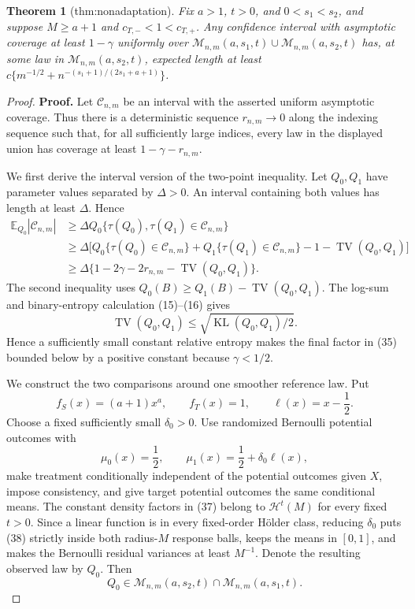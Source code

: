 \documentclass{article}
\newtheorem{theorem}{Theorem}
\begin{document}
\begin{theorem}[thm:nonadaptation]\label{thm:nonadaptation}
Fix \(a>1\), \(t>0\), and \(0<s_1<s_2\), and suppose \(M\ge a+1\) and \(c_{T,-}<1<c_{T,+}\). Any confidence interval with asymptotic coverage at least \(1-\gamma\) uniformly over \(\mathcal M_{n,m}(a,s_1,t)\cup\mathcal M_{n,m}(a,s_2,t)\) has, at some law in \(\mathcal M_{n,m}(a,s_2,t)\), expected length at least \(c\{m^{-1/2}+n^{-(s_1+1)/(2s_1+a+1)}\}\).
\end{theorem}
\begin{proof}
\textbf{Proof.}
Let \(\mathcal C_{n,m}\) be an interval with the asserted uniform asymptotic coverage. Thus there is a deterministic sequence \(r_{n,m}\to0\) along the indexing sequence such that, for all sufficiently large indices, every law in the displayed union has coverage at least \(1-\gamma-r_{n,m}\).

We first derive the interval version of the two-point inequality. Let \(Q_0,Q_1\) have parameter values separated by \(\Delta>0\). An interval containing both values has length at least \(\Delta\). Hence
\[
\begin{aligned}
\mathbb E_{Q_0}|\mathcal C_{n,m}|
&\ge\Delta Q_0\{\tau(Q_0),\tau(Q_1)\in\mathcal C_{n,m}\}\\
&\ge\Delta\bigl[Q_0\{\tau(Q_0)\in\mathcal C_{n,m}\}
+Q_1\{\tau(Q_1)\in\mathcal C_{n,m}\}
-1-\operatorname{TV}(Q_0,Q_1)\bigr]\\
&\ge\Delta\{1-2\gamma-2r_{n,m}-\operatorname{TV}(Q_0,Q_1)\}.
\end{aligned}
\tag{35}
\]
The second inequality uses \(Q_0(B)\ge Q_1(B)-\operatorname{TV}(Q_0,Q_1)\). The log-sum and binary-entropy calculation (15)--(16) gives
\[
\operatorname{TV}(Q_0,Q_1)\le\sqrt{\operatorname{KL}(Q_0,Q_1)/2}.
\tag{36}
\]
Hence a sufficiently small constant relative entropy makes the final factor in (35) bounded below by a positive constant because \(\gamma<1/2\).

We construct the two comparisons around one smoother reference law. Put
\[
f_S(x)=(a+1)x^a,
\qquad
f_T(x)=1,
\qquad
\ell(x)=x-\frac12.
\tag{37}
\]
Choose a fixed sufficiently small \(\delta_0>0\). Use randomized Bernoulli potential outcomes with
\[
\mu_0(x)=\frac12,
\qquad
\mu_1(x)=\frac12+\delta_0\ell(x),
\tag{38}
\]
make treatment conditionally independent of the potential outcomes given \(X\), impose consistency, and give target potential outcomes the same conditional means. The constant density factors in (37) belong to \(\mathcal H^t(M)\) for every fixed \(t>0\). Since a linear function is in every fixed-order H\"older class, reducing \(\delta_0\) puts (38) strictly inside both radius-\(M\) response balls, keeps the means in \([0,1]\), and makes the Bernoulli residual variances at least \(M^{-1}\). Denote the resulting observed law by \(Q_0\). Then
\[
Q_0\in\mathcal M_{n,m}(a,s_2,t)
\cap\mathcal M_{n,m}(a,s_1,t).
\tag{39}
\]


\end{proof}
\end{document}
